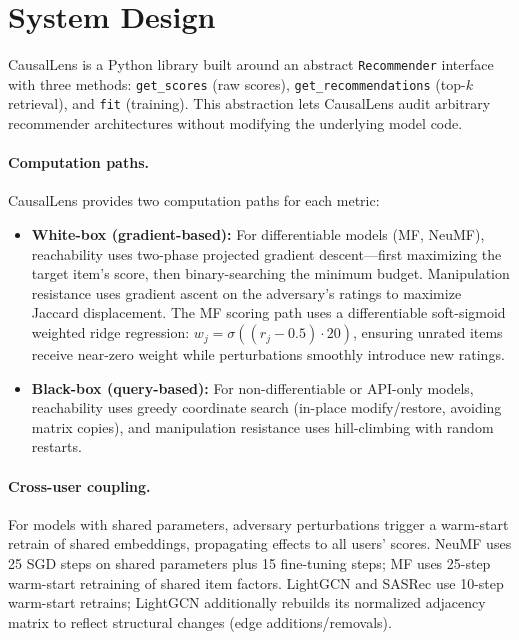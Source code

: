 \documentclass[sigconf,anonymous]{acmart}
\begin{document}
\section{System Design}
\label{sec:system}

CausalLens is a Python library built around an abstract \texttt{Recom\-mend\-er} interface with three methods: \texttt{get\_scores} (raw scores), \texttt{get\_recom\-men\-da\-tions} (top-$k$ retrieval), and \texttt{fit} (training). This abstraction lets CausalLens audit arbitrary recommender architectures without modifying the underlying model code.

\paragraph{Computation paths.}
CausalLens provides two computation paths for each metric:
\begin{itemize}
    \item \textbf{White-box (gradient-based):} For differentiable models (MF, NeuMF), reachability uses two-phase projected gradient descent---first maximizing the target item's score, then binary-searching the minimum budget. Manipulation resistance uses gradient ascent on the adversary's ratings to maximize Jaccard displacement. The MF scoring path uses a differentiable soft-sigmoid weighted ridge regression: $w_j = \sigma((r_j - 0.5) \cdot 20)$, ensuring unrated items receive near-zero weight while perturbations smoothly introduce new ratings.
    \item \textbf{Black-box (query-based):} For non-differentiable or API-only models, reachability uses greedy coordinate search (in-place modify/restore, avoiding matrix copies), and manipulation resistance uses hill-climbing with random restarts.
\end{itemize}

\paragraph{Cross-user coupling.}
For models with shared parameters, adversary perturbations trigger a warm-start retrain of shared embeddings, propagating effects to all users' scores. NeuMF uses 25 SGD steps on shared parameters plus 15 fine-tuning steps; MF uses 25-step warm-start retraining of shared item factors. LightGCN and SASRec use 10-step warm-start retrains; LightGCN additionally rebuilds its normalized adjacency matrix to reflect structural changes (edge additions/removals).
\end{document}
